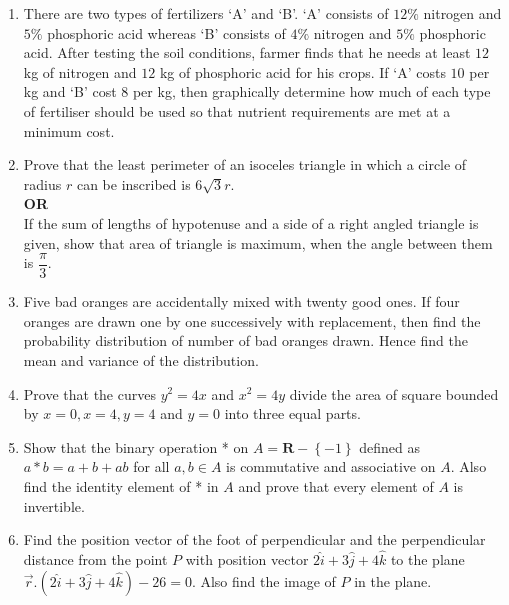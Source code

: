 \documentclass[12pt,-letter paper]{article}
\providecommand{\brak}[1]{\ensuremath{\left(#1\right)}}
\providecommand{\cbrak}[1]{\ensuremath{\left\{#1\right\}}}
\begin{document}
\begin{enumerate}
	\item There are two types of fertilizers `A' and `B'. `A' consists of $12\%$ nitrogen and $5\%$ phosphoric acid whereas `B' consists of $4\%$ nitrogen and $5\%$ phosphoric acid. After testing the soil conditions, farmer finds that he needs at least $12$ kg of nitrogen and $12$ kg of phosphoric acid for his crops. If `A' costs \rupee$10$ per kg and `B' cost \rupee$8$ per kg, then graphically determine how much of each type of fertiliser should be used so that nutrient requirements are met at a minimum cost.\\
	
	\item Prove that the least perimeter of an isoceles triangle in which a circle of radius $r$ can be inscribed is $6\sqrt{3}r$.\\
	\textbf{OR}\\
	If the sum of lengths of hypotenuse and a side of a right angled triangle is given, show that area of triangle is maximum, when the angle between them is $\dfrac{\pi}{3}$.\\
	
	\item Five bad oranges are accidentally mixed with twenty good ones. If four oranges are drawn one by one successively with replacement, then find the probability distribution of number of bad oranges drawn. Hence find the mean and variance of the distribution.\\
	
	\item Prove that the curves $y^2 = 4x$ and $x^2 = 4y$ divide the area of square bounded by $x=0, x=4, y=4$ and $y=0$ into three equal parts.\\
	
	\item Show that the binary operation *  on $A = \textbf{R} - \cbrak{-1}$ defined as $a*b = a + b + ab$ for all $a, b \in A$  is commutative and associative on $A$. Also find the identity element of * in $A$ and prove that every element of $A$ is invertible.\\
	
	\item Find the position vector of the foot of perpendicular and the perpendicular distance from the point $P$ with position vector $2\hat{i} +3\hat{j} + 4\hat{k}$ to the plane $\overrightarrow{r}.\brak{2\hat{i} + 3\hat{j} + 4\hat{k}} - 26 = 0 $. Also find the image of $P$ in the plane.
	
	
	
	
\end{enumerate}
\end{document}
